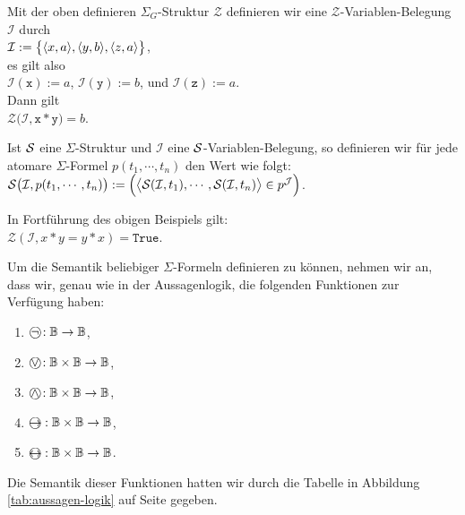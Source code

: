 \example
Mit der oben definieren $\Sigma_G$-Struktur
$\mathcal{Z}$ definieren wir eine $\mathcal{Z}$-Variablen-Belegung $\mathcal{I}$ durch
\\[0.2cm]
\hspace*{1.3cm} $\mathcal{I} := \bigl\{ \pair(x,a), \pair(y,b), \pair(z,a)\bigr\}$,
\\[0.2cm]
es gilt also
\\[0.2cm]
\hspace*{1.3cm} $\mathcal{I}(\mathtt{x}) := a$, \quad $\mathcal{I}(\mathtt{y}) := b$, \quad und \quad $\mathcal{I}(\mathtt{z}) := a$.
\\[0.2cm]
Dann gilt  \\[0.2cm]
\hspace*{1.3cm}  $\mathcal{Z}\bigl(\mathcal{I}, \mathtt{x} * \mathtt{y} \bigr) = b$. \eox

\begin{Definition}
    Ist $\mathcal{S}$ eine $\Sigma$-Struktur und $\mathcal{I}$ eine $\mathcal{S}$-Variablen-Belegung,
    so definieren wir für jede atomare $\Sigma$-Formel 
    $p(t_1, \cdots, t_n)$ den Wert  wie folgt: \\[0.2cm]
    \hspace*{1.3cm}
    $\mathcal{S}\bigl(\mathcal{I}, p(t_1,\cdots,t_n)\bigr) := 
       \Bigl(\bigl\langle \mathcal{S}(\mathcal{I}, t_1), \cdots, \mathcal{S}(\mathcal{I}, t_n) \bigr\rangle \in p^\mathcal{J}\Bigr)$.
    \eox
\end{Definition}

\example
In Fortführung des obigen Beispiels gilt: 
\\[0.2cm]
\hspace*{1.3cm} 
$\mathcal{Z}(\mathcal{I},x * y = y * x) = \mathtt{True}$.
\eox

Um die Semantik beliebiger $\Sigma$-Formeln definieren zu können, nehmen wir an, dass wir,
genau wie in der Aussagenlogik, die folgenden Funktionen zur Verfügung haben:
\begin{enumerate}
\item $\circneg: \mathbb{B} \rightarrow \mathbb{B}$,
\item $\circvee: \mathbb{B} \times \mathbb{B} \rightarrow \mathbb{B}$,
\item $\circwedge: \mathbb{B} \times \mathbb{B} \rightarrow \mathbb{B}$,
\item $\circright: \mathbb{B} \times \mathbb{B} \rightarrow \mathbb{B}$,
\item $\circleftright: \mathbb{B} \times \mathbb{B} \rightarrow \mathbb{B}$.
\end{enumerate}
Die Semantik dieser Funktionen hatten wir durch die Tabelle in Abbildung
\ref{tab:aussagen-logik} auf Seite \pageref{tab:aussagen-logik} gegeben. 

